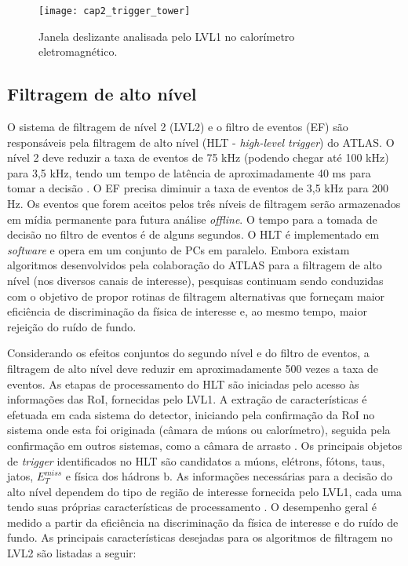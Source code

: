 \begin{figure} \centering
\texttt{[image: cap2\_trigger\_tower]}
\caption{Janela deslizante analisada pelo LVL1 no calorímetro
eletromagnético.} \label{lvl1}
\end{figure}

\subsection{Filtragem de alto nível}

O sistema de filtragem de nível 2 (LVL2) e o filtro de eventos (EF)
são responsáveis pela filtragem de alto nível (HLT -
\textit{high-level trigger}) do ATLAS. O nível 2 deve reduzir a taxa
de eventos de 75 kHz (podendo chegar até 100 kHz) para 3,5 kHz,
tendo um tempo de latência de aproximadamente 40 ms para tomar a
decisão \cite{TDR:ATLAS:2003}. O EF precisa diminuir a taxa de
eventos de 3,5 kHz para 200 Hz. Os eventos que forem aceitos pelos
três níveis de filtragem serão armazenados em mídia permanente para
futura análise \textit{offline}. O tempo para a tomada de decisão no
filtro de eventos é de alguns segundos. O HLT é implementado em
\textit{software} e opera em um conjunto de PCs em paralelo. Embora
existam algoritmos desenvolvidos pela colaboração do ATLAS para a
filtragem de alto nível (nos diversos canais de interesse),
pesquisas continuam sendo conduzidas com o objetivo de propor
rotinas de filtragem alternativas que forneçam maior eficiência de
discriminação da física de interesse e, ao mesmo tempo, maior
rejeição do ruído de fundo.

Considerando os efeitos conjuntos do segundo nível e do filtro de
eventos, a filtragem de alto nível deve reduzir em aproximadamente
500 vezes a taxa de eventos. As etapas de processamento do HLT são
iniciadas pelo acesso às informações das RoI, fornecidas pelo
LVL1. A extração de características é efetuada em cada sistema do
detector, iniciando pela confirmação da RoI no sistema onde esta
foi originada (câmara de múons ou calorímetro), seguida pela
confirmação em outros sistemas, como a câmara de arrasto
\cite{TDR1:ATLAS:1999}. Os principais objetos de \textit{trigger}
identificados no HLT são candidatos a múons, elétrons, fótons,
taus, jatos, $E_T^{miss}$ e física dos hádrons b. As informações
necessárias para a decisão do alto nível dependem do tipo de
região de interesse fornecida pelo LVL1, cada uma tendo suas
próprias características de processamento \cite{TDR:ATLAS:2003}. O
desempenho geral é medido a partir da eficiência na discriminação
da física de interesse e do ruído de fundo. As principais
características desejadas para os algoritmos de filtragem no LVL2
são listadas a seguir:

